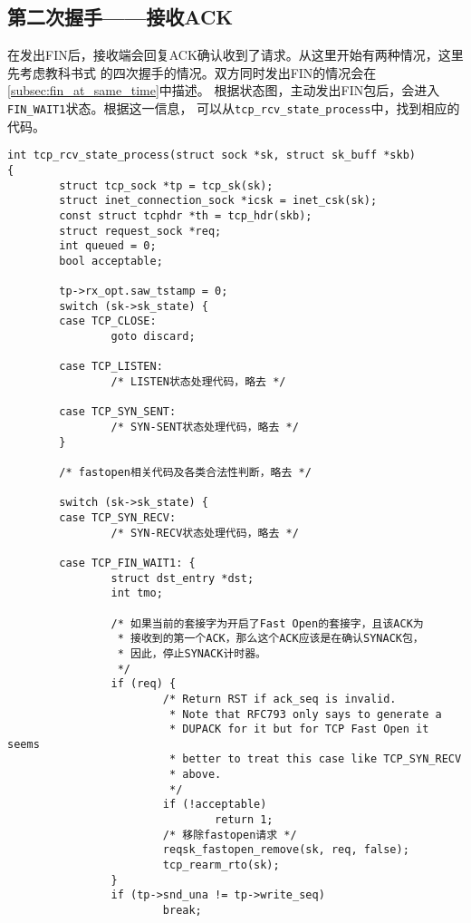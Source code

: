 	\subsection{第二次握手——接收ACK}
		在发出FIN后，接收端会回复ACK确认收到了请求。从这里开始有两种情况，这里先考虑教科书式
		的四次握手的情况。双方同时发出FIN的情况会在\ref{subsec:fin_at_same_time}中描述。
		根据状态图，主动发出FIN包后，会进入\texttt{FIN_WAIT1}状态。根据这一信息，
		可以从\texttt{tcp_rcv_state_process}中，找到相应的代码。
\begin{verbatim}
int tcp_rcv_state_process(struct sock *sk, struct sk_buff *skb)
{
        struct tcp_sock *tp = tcp_sk(sk);
        struct inet_connection_sock *icsk = inet_csk(sk);
        const struct tcphdr *th = tcp_hdr(skb);
        struct request_sock *req;
        int queued = 0;
        bool acceptable;

        tp->rx_opt.saw_tstamp = 0;
        switch (sk->sk_state) {
        case TCP_CLOSE:
                goto discard;

        case TCP_LISTEN:
                /* LISTEN状态处理代码，略去 */

        case TCP_SYN_SENT:
                /* SYN-SENT状态处理代码，略去 */
        }

        /* fastopen相关代码及各类合法性判断，略去 */

        switch (sk->sk_state) {
        case TCP_SYN_RECV:
                /* SYN-RECV状态处理代码，略去 */
        
        case TCP_FIN_WAIT1: {
                struct dst_entry *dst;
                int tmo;

                /* 如果当前的套接字为开启了Fast Open的套接字，且该ACK为
                 * 接收到的第一个ACK，那么这个ACK应该是在确认SYNACK包，
                 * 因此，停止SYNACK计时器。
                 */
                if (req) {
                        /* Return RST if ack_seq is invalid.
                         * Note that RFC793 only says to generate a
                         * DUPACK for it but for TCP Fast Open it seems
                         * better to treat this case like TCP_SYN_RECV
                         * above.
                         */
                        if (!acceptable)
                                return 1;
                        /* 移除fastopen请求 */
                        reqsk_fastopen_remove(sk, req, false);
                        tcp_rearm_rto(sk);
                }
                if (tp->snd_una != tp->write_seq)
                        break;


\end{verbatim}
